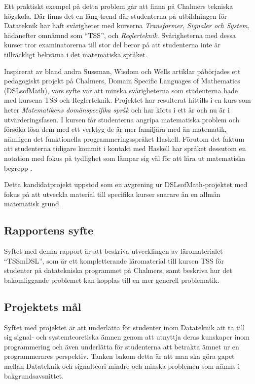 \documentclass[12pt,a4paper,twoside,openright]{article}
\begin{document}
Ett praktiskt exempel på detta problem går att finna på Chalmers tekniska högskola.
Där finns det en lång trend där studenterna på utbildningen för Datateknik har
haft svårigheter med kurserna \textit{Transformer, Signaler och System}, hädanefter
omnämnd som ``\gls{TSS}'', och \textit{Reglerteknik}.
Svårigheterna med dessa kurser tror examinatorerna till stor del beror på att
studenterna inte är tillräckligt bekväma i det matematiska språket.

Inspirerat av bland andra Sussman, Wisdom och Wells artiklar påbörjades ett
pedagogiskt projekt på Chalmers, Domain Specific Languages of Mathematics (\gls{DSLsofMath}), vars syfte var att minska
svårigheterna som studenterna hade med kursena TSS och Reglerteknik.
Projektet har resulterat hittills i en kurs som heter
\textit{Matematikens domänspecifika språk} och har körts i ett år och nu
är i utvärderingsfasen. I kursen får studenterna angripa
matematiska problem och försöka lösa dem med ett verktyg de är
mer familjära med än matematik, nämligen det funktionella
programmerings\-språket Haskell. Förutom det faktum att studenterna tidigare
kommit i kontakt med Haskell har språket dessutom en notation med fokus på
tydlighet som lämpar sig väl för att lära ut matematiska begrepp
\cite{TFPIE15_DSLsofMath_IonescuJansson}.

Detta kandidatprojekt uppstod som en avgrening ur DSLsofMath-projektet med fokus
på att utveckla material till specifika kurser snarare än en allmän matematisk grund.

\subsection{Rapportens syfte}


Syftet med denna rapport är att beskriva utvecklingen av läromaterialet
``\gls{TSSmDSL}'', som är ett kompletterande läromaterial till kursen TSS
för studenter på datatekniska programmet på Chalmers, samt beskriva hur det
bakomliggande problemet kan kopplas till en mer generell problematik.

\subsection{Projektets mål}
Syftet med projektet är att underlätta för studenter inom Datateknik att
ta till sig signal- och systemteoretiska ämnen genom att utnyttja deras
kunskaper inom programmering och även underlätta för studenterna att betrakta
ämnet ur en programmerares perspektiv. Tanken bakom detta är att man ska göra
gapet mellan Datateknik och signalteori mindre och minska problemen som nämns
i bakgrundsavsnittet.
\end{document}
